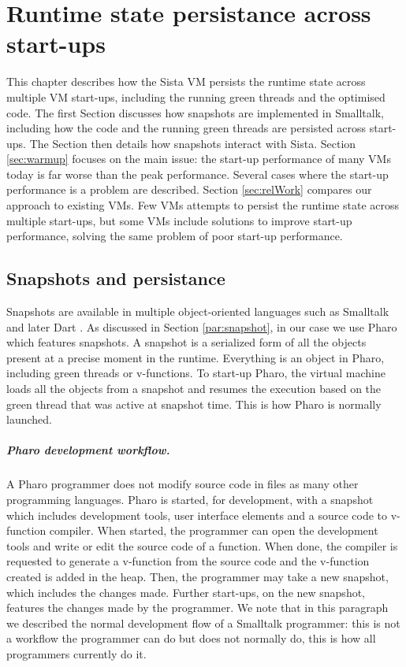 \documentclass[a4paper,12pt,twoside]{../includes/ThesisStyle}
\begin{document}
\fi

\chapter{Runtime state persistance across start-ups}
\label{chap:persistance}
\minitoc

This chapter describes how the Sista VM persists the runtime state across multiple VM start-ups, including the running green threads and the optimised code. The first Section discusses how snapshots are implemented in Smalltalk, including how the code and the running green threads are persisted across start-ups. The Section then details how snapshots interact with Sista. Section \ref{sec:warmup} focuses on the main issue: the start-up performance of many VMs today is far worse than the peak performance. Several cases where the start-up performance is a problem are described.  Section \ref{sec:relWork} compares our approach to existing VMs. Few VMs attempts to persist the runtime state across multiple start-ups, but some VMs include solutions to improve start-up performance, solving the same problem of poor start-up performance.

\section{Snapshots and persistance}

Snapshots are available in multiple object-oriented languages such as Smalltalk \cite{Gold83a} and later Dart \cite{Anna13a}. As discussed in Section \ref{par:snapshot}, in our case we use Pharo which features snapshots. A snapshot is a serialized form of all the objects present at a precise moment in the runtime. Everything is an object in Pharo, including green threads or v-functions. To start-up Pharo, the virtual machine loads all the objects from a snapshot and resumes the execution based on the green thread that was active at snapshot time. This is how Pharo is normally launched.

\paragraph{Pharo development workflow.}A Pharo programmer does not modify source code in files as many other programming languages. Pharo is started, for development, with a snapshot which includes development tools, user interface elements and a source code to v-function compiler. When started, the programmer can open the development tools and write or edit the source code of a function. When done, the compiler is requested to generate a v-function from the source code and the v-function created is added in the heap. Then, the programmer may take a new snapshot, which includes the changes made. Further start-ups, on the new snapshot, features the changes made by the programmer. We note that in this paragraph we described the normal development flow of a Smalltalk programmer: this is not a workflow the programmer can do but does not normally do, this is how all programmers currently do it.
\end{document}
